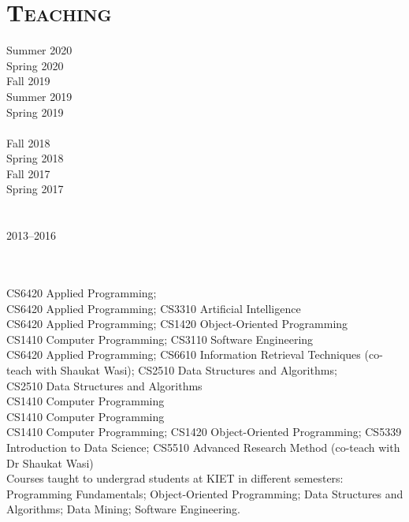 \documentclass[a4paper, 10pt]{article}
\begin{document}
\section*{\normalfont\textsc{Teaching}}
\hfill\begin{minipage}{0.22\textwidth}
Summer 2020\textcolor{lightgray}{\dotfill}\\
Spring 2020\textcolor{lightgray}{\dotfill}\\
Fall 2019\textcolor{lightgray}{\dotfill}\\
Summer 2019\textcolor{lightgray}{\dotfill}\\
Spring 2019\textcolor{lightgray}{\dotfill}\\\\
Fall 2018\textcolor{lightgray}{\dotfill}\\
Spring 2018\textcolor{lightgray}{\dotfill}\\
Fall 2017\textcolor{lightgray}{\dotfill}\\
Spring 2017\textcolor{lightgray}{\dotfill}\\\\\\
2013--2016\textcolor{lightgray}{\dotfill}\\\\\\
\end{minipage}
\begin{minipage}{0.75\textwidth}
CS6420 Applied Programming;\\
CS6420 Applied Programming; CS3310 Artificial Intelligence\\
CS6420 Applied Programming; CS1420 Object-Oriented Programming\\
CS1410 Computer Programming; CS3110 Software Engineering\\
CS6420 Applied Programming; CS6610 Information Retrieval Techniques (co-teach with Shaukat Wasi); CS2510 Data Structures and Algorithms;\\
CS2510 Data Structures and Algorithms\\
CS1410 Computer Programming\\
CS1410 Computer Programming\\
CS1410 Computer Programming; CS1420 Object-Oriented Programming; CS5339 Introduction to Data Science; CS5510 Advanced Research Method (co-teach with Dr Shaukat Wasi)\\
Courses taught to undergrad students at KIET in different semesters: Programming Fundamentals; Object-Oriented Programming; Data Structures and Algorithms; Data Mining; Software Engineering.\\%
\end{minipage}
\end{document}
